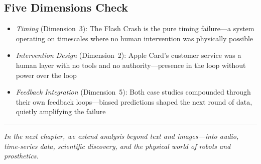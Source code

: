 \subsection*{Five Dimensions Check}

\begin{itemize}
    \item \textit{Timing} (Dimension~3): The Flash Crash is the pure timing failure---a system operating on timescales where no human intervention was physically possible
    \item \textit{Intervention Design} (Dimension~2): Apple Card's customer service was a human layer with no tools and no authority---presence in the loop without power over the loop
    \item \textit{Feedback Integration} (Dimension~5): Both case studies compounded through their own feedback loops---biased predictions shaped the next round of data, quietly amplifying the failure
\end{itemize}

\bigskip
\begin{center}
\rule{0.5\textwidth}{0.4pt}
\end{center}
\bigskip

\noindent\textit{In the next chapter, we extend \hitl analysis beyond text and images---into audio, time-series data, scientific discovery, and the physical world of robots and prosthetics.}
